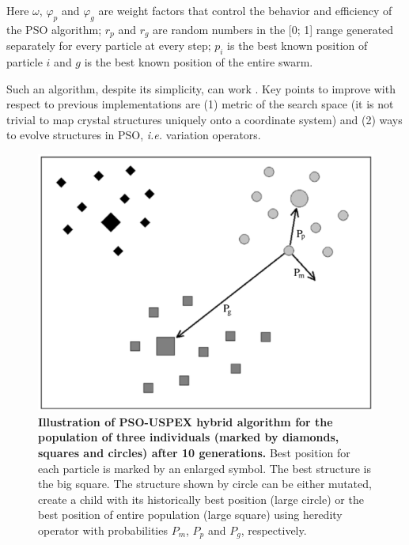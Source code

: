 \documentclass[12pt]{article}
\begin{document}
Here $\omega$, $\varphi_{p}$ and $\varphi_{g}$ are weight factors that control
the behavior and efficiency of the PSO algorithm; $r_{p}$ and $r_{g}$ are random
numbers in the [0; 1] range generated separately for every particle at every
step; $p_{i}$ is the best known position of particle $i$ and $g$ is the best
known position of the entire swarm.

Such an algorithm, despite its simplicity, can work \cite{Boldyrev2007}. Key
points to improve with respect to previous implementations \cite{Boldyrev2007,
Wang2010} are (1) metric of the search space (it is not trivial to map crystal
structures uniquely onto a coordinate system) and (2) ways to evolve structures
in PSO, \emph{i.e.} variation operators.

\begin{figure}[htbp] \centering
\includegraphics[scale=0.3]{pic/PSO}
\caption{\footnotesize \textbf{Illustration of PSO-USPEX hybrid algorithm for
the population of three individuals (marked by diamonds, squares and circles)
after 10 generations.} Best position for each particle is marked by an enlarged
symbol. The best structure is the big square. The structure shown by circle can
be either mutated, create a child with its historically best position (large
circle) or the best position of entire population (large square) using heredity
operator with probabilities $P_{m}$, $P_{p}$ and $P_{g}$, respectively.}
\label{fig:pso}
\end{figure}
\end{document}
